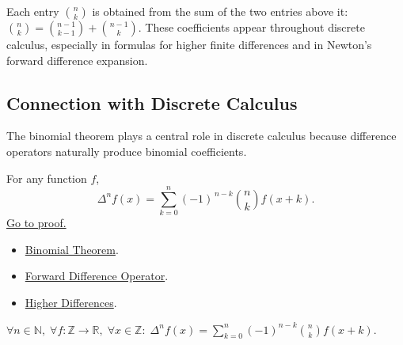 \begin{center}
\end{center}

\begin{remark*}
Each entry \(\binom{n}{k}\) is obtained from the sum of the two entries
above it: \(\binom{n}{k}=\binom{n-1}{k-1}+\binom{n-1}{k}\).
These coefficients appear throughout discrete calculus, especially in
formulas for higher finite differences and in Newton's forward difference
expansion.
\end{remark*}

\subsection*{Connection with Discrete Calculus}

\begin{remark*}
The binomial theorem plays a central role in discrete calculus because
difference operators naturally produce binomial coefficients.
\end{remark*}

\begin{proposition}
\label{prop:higher-diff-formula}
For any function \(f\),
\[
\Delta^n f(x)
=
\sum_{k=0}^{n} (-1)^{\,n-k}
\binom{n}{k}
f(x+k).
\]
\hyperref[prf:higher-diff-formula]{Go to proof.}
\end{proposition}

\begin{dependencies}
\begin{itemize}
  \item \hyperref[thm:binomial]{Binomial Theorem}.
  \item \hyperref[def:forward-difference]{Forward Difference Operator}.
  \item \hyperref[def:higher-differences]{Higher Differences}.
\end{itemize}
\end{dependencies}

\begin{remark*}
\(\forall n \in \mathbb{N},\; \forall f : \mathbb{Z}\to\mathbb{R},\; \forall x \in \mathbb{Z}:\;
\Delta^n f(x) = \displaystyle\sum_{k=0}^{n}(-1)^{n-k}\binom{n}{k}f(x+k)\).
\end{remark*}

